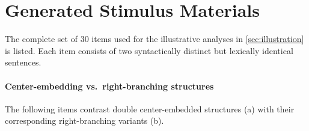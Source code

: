 \documentclass[11pt]{article}
\begin{document}
\section{Generated Stimulus Materials}\label{app:sents}

The complete set of 30 items used for the illustrative analyses in \cref{sec:illustration} is listed. Each item consists of two syntactically distinct but lexically identical sentences.

\paragraph{Center-embedding vs.\ right-branching structures}
The following items contrast double center-embedded structures (a) with their corresponding right-branching variants (b).
\end{document}
